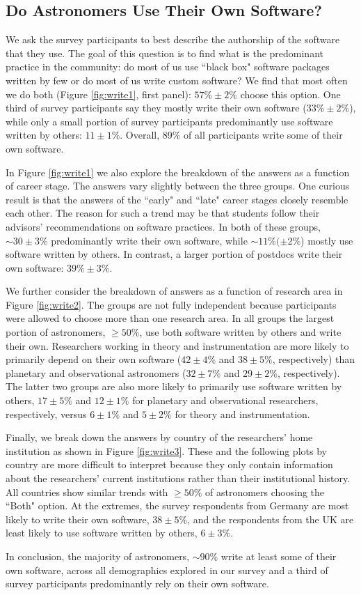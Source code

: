 \subsection{Do Astronomers Use Their Own Software?}
\label{ssec:own}

We ask the survey participants to best describe the authorship of the software that they use. The goal of this question is to find what is the predominant practice in the community: do most of us use ``black box" software packages written by few or do most of us write custom software? We find that most often we do both (Figure \ref{fig:write1}, first panel): $57\%\pm2\%$ choose this option. One third of survey participants say they mostly write their own software ($33\%\pm2\%$), while only a small portion of survey participants predominantly use software written by others: $11\pm1\%$. Overall, 89\% of all participants write some of their own software.

In Figure \ref{fig:write1} we also explore the breakdown of the answers as a function of career stage. The answers vary slightly between the three groups. One curious result is that the answers of the ``early" and ``late" career stages closely resemble each other. The reason for such a trend may be that students follow their advisors' recommendations on software practices. In both of these groups, $\sim30\pm3\%$ predominantly write their own software, while $\sim11\%(\pm2\%$) mostly use software written by others. In contrast, a larger portion of postdocs write their own software: $39\%\pm3\%$. 

We further consider the breakdown of answers as a function of research area in Figure \ref{fig:write2}. The groups are not fully independent because participants were allowed to choose more than one research area. In all groups the largest portion of astronomers, $\ge50\%$, use both software written by others and write their own. Researchers working in theory and instrumentation are more likely to primarily depend on their own software ($42\pm4\%$ and $38\pm5\%$, respectively) than planetary and observational astronomers ($32\pm7\%$ and $29\pm2\%$, respectively). The latter two groups are also more likely to primarily use software written by others, $17\pm5\%$ and $12\pm1\%$ for planetary and observational researchers, respectively, versus $6\pm1\%$ and $5\pm2\%$ for theory and instrumentation.

Finally, we break down the answers by country of the researchers' home institution as shown in Figure \ref{fig:write3}. These and the following plots by country are more difficult to interpret because they only contain information about the researchers' current institutions rather than their institutional history. All countries show similar trends with $\ge50\%$ of astronomers choosing the ``Both" option. At the extremes, the survey respondents from Germany are most likely to write their own software, $38\pm5\%$, and the respondents from the UK are least likely to use software written by others, $6\pm3\%$.

In conclusion, the majority of astronomers, $\sim90\%$ write at least some of their own software, across all demographics explored in our survey and a third of survey participants predominantly rely on their own software.  
    
    
    
  
  
  